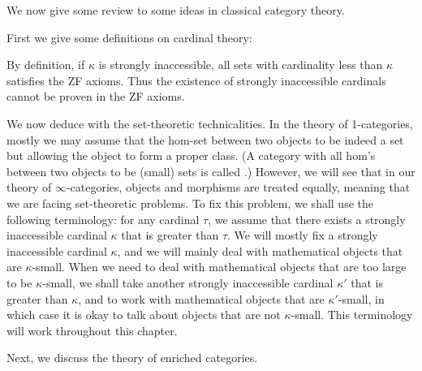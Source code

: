 \label{secc}

We now give some review to some ideas in classical category theory. 

First we give some definitions on cardinal theory:


By definition, if $\kappa$ is strongly inaccessible, all sets with cardinality less than $\kappa$ satisfies the ZF axioms.
Thus the existence of strongly inaccessible cardinals cannot be proven in the ZF axioms.

\tbc

We now deduce with the set-theoretic technicalities. In the theory of 1-categories, mostly we may assume that 
the hom-set between two objects to be indeed a set but allowing the object to form a proper class.
(A category with all hom's between two objects to be (small) sets is called .) However,
we will see that in our theory of $\infty$-categories, objects and morphisms are treated equally,
meaning that we are facing set-theoretic problems. To fix this problem, we shall use the following terminology:
for any cardinal $\tau$, we assume that there exists a strongly inaccessible cardinal
$\kappa$ that is greater than $\tau$. We will mostly fix a strongly inaccessible cardinal $\kappa$, and we will mainly deal with
mathematical objects that are $\kappa$-small. When we need to deal with mathematical objects that are too large to be
$\kappa$-small, we shall take another strongly inaccessible cardinal $\kappa'$ that is greater than $\kappa$, and to work
with mathematical objects that are $\kappa'$-small, in which case it is okay to talk about objects that are not $\kappa$-small.
This terminology will work throughout this chapter.

Next, we discuss the theory of enriched categories.

